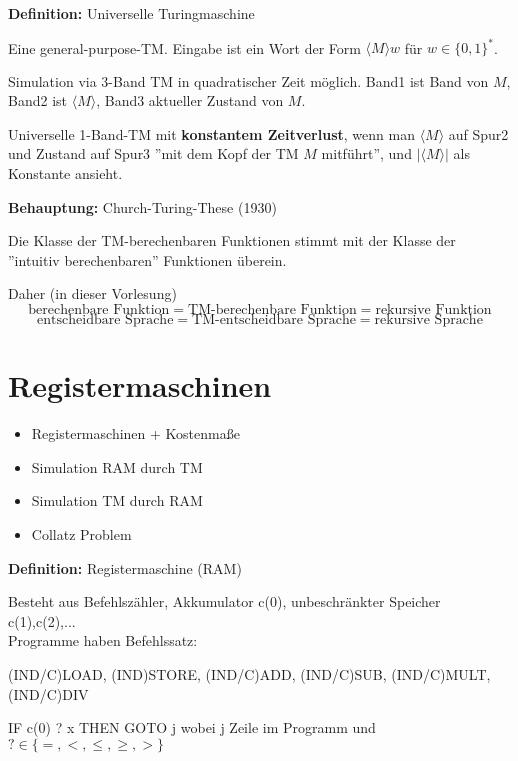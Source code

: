 \documentclass[a4paper,graphics,11pt]{article}
\newcommand{\godel}[1]{\langle #1 \rangle}
\begin{document}
\strut

\textbf{Definition:} Universelle Turingmaschine

Eine general-purpose-TM. Eingabe ist ein Wort der Form $\langle M\rangle w$ für $w \in \{0,1\}^*$.

Simulation via 3-Band TM in quadratischer Zeit möglich.
Band1 ist Band von $M$, Band2 ist $\godel{M}$, Band3 aktueller Zustand von $M$.

Universelle 1-Band-TM mit \textbf{konstantem Zeitverlust}, wenn man $\godel{M}$ auf Spur2 und Zustand
auf Spur3 ''mit dem Kopf der TM $M$ mitführt'', und $|\godel{M}|$ als Konstante ansieht.

\strut

\textbf{Behauptung:} Church-Turing-These (1930)

Die Klasse der TM-berechenbaren Funktionen stimmt mit der Klasse der\\
''intuitiv berechenbaren'' Funktionen überein.

Daher (in dieser Vorlesung)
$$
    \text{berechenbare Funktion} = \text{TM-berechenbare Funktion} = \text{rekursive Funktion}
$$$$
    \text{entscheidbare Sprache} = \text{TM-entscheidbare Sprache} = \text{rekursive Sprache}
$$



\newpage



\section{Registermaschinen}

\begin{itemize}
    \item Registermaschinen + Kostenmaße
    \item Simulation RAM durch TM
    \item Simulation TM durch RAM
    \item Collatz Problem
\end{itemize}

\textbf{Definition:} Registermaschine (RAM)

Besteht aus Befehlszähler, Akkumulator c(0), unbeschränkter Speicher c(1),c(2),...\\
Programme haben Befehlssatz:

(IND/C)LOAD, (IND)STORE, (IND/C)ADD, (IND/C)SUB, (IND/C)MULT, (IND/C)DIV

IF c(0) ? x THEN GOTO j \qquad wobei j Zeile im Programm und $? \in \{=,<,\leq,\geq,>\}$
\end{document}
